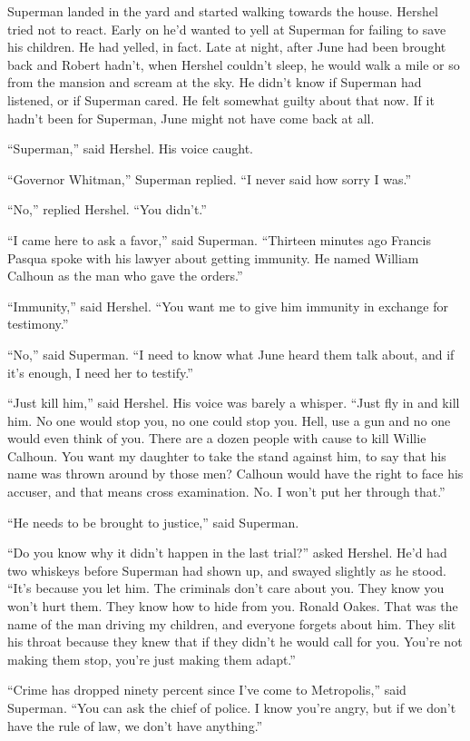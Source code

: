 \documentclass[ebook,12pt]{memoir}
\begin{document}
Superman landed in the yard and started walking towards the house.
Hershel tried not to react. Early on he'd wanted to yell at Superman for
failing to save his children. He had yelled, in fact. Late at night,
after June had been brought back and Robert hadn't, when Hershel
couldn't sleep, he would walk a mile or so from the mansion and scream
at the sky. He didn't know if Superman had listened, or if Superman
cared. He felt somewhat guilty about that now. If it hadn't been for
Superman, June might not have come back at all.

``Superman,'' said Hershel. His voice caught.

``Governor Whitman,'' Superman replied. ``I never said how sorry I
was.''

``No,'' replied Hershel. ``You didn't.''

``I came here to ask a favor,'' said Superman. ``Thirteen minutes ago
Francis Pasqua spoke with his lawyer about getting immunity. He named
William Calhoun as the man who gave the orders.''

``Immunity,'' said Hershel. ``You want me to give him immunity in
exchange for testimony.''

``No,'' said Superman. ``I need to know what June heard them talk about,
and if it's enough, I need her to testify.''

``Just kill him,'' said Hershel. His voice was barely a whisper. ``Just
fly in and kill him. No one would stop you, no one could stop you. Hell,
use a gun and no one would even think of you. There are a dozen people
with cause to kill Willie Calhoun. You want my daughter to take the
stand against him, to say that his name was thrown around by those men?
Calhoun would have the right to face his accuser, and that means cross
examination. No. I won't put her through that.''

``He needs to be brought to justice,'' said Superman.

``Do you know why it didn't happen in the last trial?'' asked Hershel.
He'd had two whiskeys before Superman had shown up, and swayed slightly
as he stood. ``It's because you let him. The criminals don't care about
you. They know you won't hurt them. They know how to hide from you.
Ronald Oakes. That was the name of the man driving my children, and
everyone forgets about him. They slit his throat because they knew that
if they didn't he would call for you. You're not making them stop,
you're just making them adapt.''

``Crime has dropped ninety percent since I've come to Metropolis,'' said
Superman. ``You can ask the chief of police. I know you're angry, but if
we don't have the rule of law, we don't have anything.''
\end{document}
